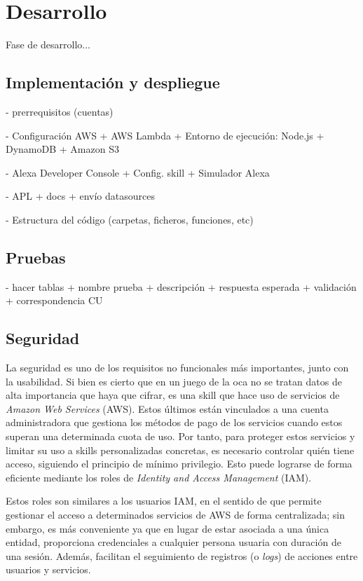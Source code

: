 \section{Desarrollo}
Fase de desarrollo...

\subsection{Implementación y despliegue}

- prerrequisitos (cuentas)

- Configuración AWS
+ AWS Lambda
+ Entorno de ejecución: Node.js
+ DynamoDB
+ Amazon S3

- Alexa Developer Console
+ Config. skill
+ Simulador Alexa

- APL
+ docs
+ envío datasources

- Estructura del código (carpetas, ficheros, funciones, etc)

\subsection{Pruebas}
- hacer tablas
+ nombre prueba
+ descripción
+ respuesta esperada
+ validación
+ correspondencia CU

\subsection{Seguridad}

La seguridad es uno de los requisitos no funcionales más importantes, junto con la usabilidad. Si bien es cierto que en un juego de la oca no se tratan datos de alta importancia que haya que cifrar, es una skill que hace uso de servicios de \textit{Amazon Web Services} (AWS). Estos últimos están vinculados a una cuenta administradora que gestiona los métodos de pago de los servicios cuando estos superan una determinada cuota de uso. Por tanto, para proteger estos servicios y limitar su uso a skills personalizadas concretas, es necesario controlar quién tiene acceso, siguiendo el principio de mínimo privilegio. Esto puede lograrse de forma eficiente mediante los roles de \textit{Identity and Access Management} (IAM).

Estos roles son similares a los usuarios IAM, en el sentido de que permite gestionar el acceso a determinados servicios de AWS de forma centralizada; sin embargo, es más conveniente ya que en lugar de estar asociada a una única entidad, proporciona credenciales a cualquier persona usuaria con duración de una sesión. Además, facilitan el seguimiento de registros (o \textit{logs}) de acciones entre usuarios y servicios.

